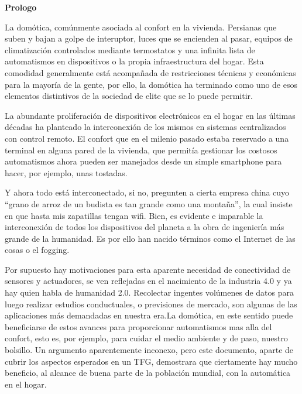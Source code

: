 
\newpage

\thispagestyle{empty}
\begin{center}

{\bf \Huge Prologo}
\end{center}
\vspace{1cm}


La domótica, comúnmente asociada al confort en la vivienda. Persianas que suben y bajan a golpe de interuptor, luces que se encienden al pasar, equipos de climatización controlados mediante termostatos y una infinita lista de automatismos en dispositivos o la propia infraestructura del hogar. Esta comodidad generalmente está acompañada de restricciones técnicas y económicas para la mayoría de la gente, por ello, la domótica ha terminado como uno de esos elementos distintivos de la sociedad de elite que se lo puede permitir.

La abundante proliferación de dispositivos electrónicos en el hogar en las últimas décadas ha planteado la interconexión de los mismos en sistemas centralizados con control remoto. El confort que en el milenio pasado estaba reservado a una terminal en alguna pared de la vivienda, que permitía gestionar los costosos automatismos ahora pueden ser manejados desde un simple smartphone para hacer, por ejemplo, unas tostadas.

Y ahora todo está interconectado, si no, pregunten a cierta empresa china cuyo “grano de arroz de un budista es tan grande como una montaña”, la cual insiste en que hasta mis zapatillas tengan wifi. Bien, es evidente e imparable la interconexión de todos los dispositivos del planeta a la obra de ingeniería más grande de la humanidad. Es por ello han nacido términos como el Internet de las cosas o el fogging.

Por supuesto hay motivaciones para esta aparente necesidad de conectividad de sensores y actuadores, se ven reflejadas en el nacimiento de la industria 4.0 y ya hay quien habla de humanidad 2.0. Recolectar ingentes volúmenes de datos para luego realizar estudios conductuales, o previsiones de mercado, son algunas de las aplicaciones más demandadas en nuestra era.La domótica, en este sentido puede beneficiarse de estos avances para proporcionar automatismos mas alla del confort, esto es, por ejemplo, para cuidar el medio ambiente y de paso, nuestro bolsillo. Un argumento aparentemente inconexo, pero este documento, aparte de cubrir los aspectos esperados en un TFG, demostrara que ciertamente hay mucho beneficio, al alcance de buena parte de la población mundial, con la automática en el hogar.
